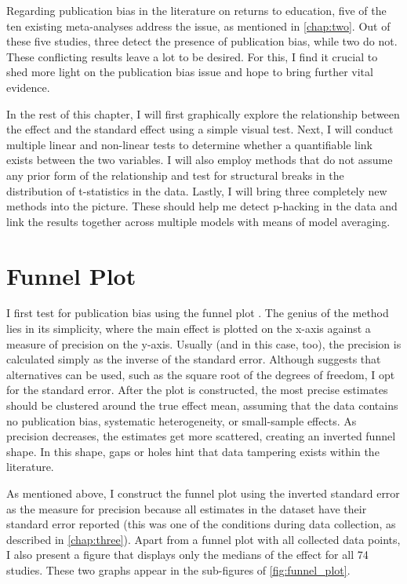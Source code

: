 Regarding publication bias in the literature on returns to education, five of the ten existing meta-analyses address the issue, as mentioned in \autoref{chap:two}. Out of these five studies, three detect the presence of publication bias, while two do not. These conflicting results leave a lot to be desired. For this, I find it crucial to shed more light on the publication bias issue and hope to bring further vital evidence.

In the rest of this chapter, I will first graphically explore the relationship between the effect and the standard effect using a simple visual test. Next, I will conduct multiple linear and non-linear tests to determine whether a quantifiable link exists between the two variables. I will also employ methods that do not assume any prior form of the relationship and test for structural breaks in the distribution of t-statistics in the data. Lastly, I will bring three completely new methods into the picture. These should help me detect p-hacking in the data and link the results together across multiple models with means of model averaging.

\section{Funnel Plot}
\label{sec:funnel_plot}

I first test for publication bias using the funnel plot \citep{Egger1997, stanley2005beyond}. The genius of the method lies in its simplicity, where the main effect is plotted on the x-axis against a measure of precision on the y-axis. Usually (and in this case, too), the precision is calculated simply as the inverse of the standard error. Although \cite{stanley2005beyond} suggests that alternatives can be used, such as the square root of the degrees of freedom, I opt for the standard error. After the plot is constructed, the most precise estimates should be clustered around the true effect mean, assuming that the data contains no publication bias, systematic heterogeneity, or small-sample effects. As precision decreases, the estimates get more scattered, creating an inverted funnel shape. In this shape, gaps or holes hint that data tampering exists within the literature.

As mentioned above, I construct the funnel plot using the inverted standard error as the measure for precision because all estimates in the dataset have their standard error reported (this was one of the conditions during data collection, as described in \autoref{chap:three}). Apart from a funnel plot with all collected data points, I also present a figure that displays only the medians of the effect for all 74 studies. These two graphs appear in the sub-figures of \autoref{fig:funnel_plot}.

